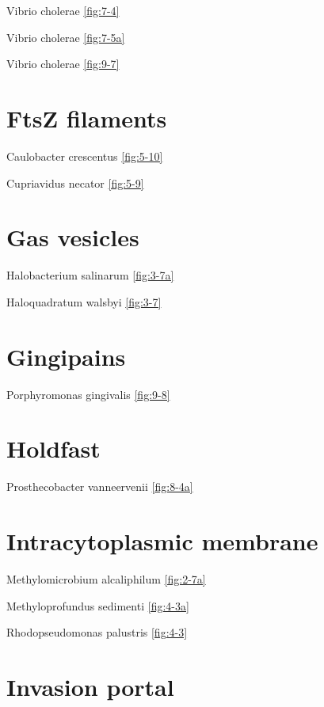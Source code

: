 \documentclass[]{tufte-book}
\begin{document}
Vibrio cholerae \ref{fig:7-4}

Vibrio cholerae \ref{fig:7-5a}

Vibrio cholerae \ref{fig:9-7}

\hypertarget{ftsz-filaments}{%
\section*{FtsZ filaments}\label{ftsz-filaments}}

Caulobacter crescentus \ref{fig:5-10}

Cupriavidus necator \ref{fig:5-9}

\hypertarget{gas-vesicles}{%
\section*{Gas vesicles}\label{gas-vesicles}}

Halobacterium salinarum \ref{fig:3-7a}

Haloquadratum walsbyi \ref{fig:3-7}

\hypertarget{gingipains}{%
\section*{Gingipains}\label{gingipains}}

Porphyromonas gingivalis \ref{fig:9-8}

\hypertarget{holdfast}{%
\section*{Holdfast}\label{holdfast}}

Prosthecobacter vanneervenii \ref{fig:8-4a}

\hypertarget{intracytoplasmic-membrane}{%
\section*{Intracytoplasmic membrane}\label{intracytoplasmic-membrane}}

Methylomicrobium alcaliphilum \ref{fig:2-7a}

Methyloprofundus sedimenti \ref{fig:4-3a}

Rhodopseudomonas palustris \ref{fig:4-3}

\hypertarget{invasion-portal}{%
\section*{Invasion portal}\label{invasion-portal}}
\end{document}
